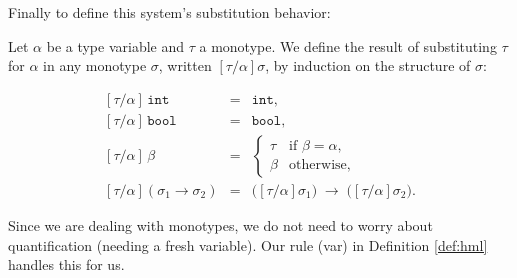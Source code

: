 \newpage
\noindent
Finally to define this system's substitution behavior:
\begin{Def}

    Let \(\alpha\) be a type variable and \(\tau\) a monotype.  We define the result of substituting \(\tau\) for \(\alpha\) in any monotype \(\sigma\), written \([\tau/\alpha]\sigma\), by induction on the structure of \(\sigma\):
    
    \[
    \begin{array}{rcl}
    [\tau/\alpha]\,\texttt{int}
    &=& 
    \texttt{int},
    \\[6pt]
    [\tau/\alpha]\,\texttt{bool}
    &=& 
    \texttt{bool},
    \\[6pt]
    [\tau/\alpha]\,\beta
    &=&
    \begin{cases}
      \tau       & \text{if }\beta = \alpha,\\
      \beta      & \text{otherwise},
    \end{cases}
    \\[12pt]
    [\tau/\alpha](\sigma_1 \to \sigma_2)
    &=&
    \bigl([\tau/\alpha]\sigma_1\bigr)\;\to\;\bigl([\tau/\alpha]\sigma_2\bigr).
    \end{array}
    \]

    \noindent
    Since we are dealing with monotypes, we do not need to worry about quantification (needing a fresh variable).
    Our rule (var) in Definition \ref{def:hml} handles this for us.
    \end{Def}

